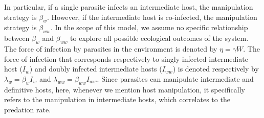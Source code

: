 \documentclass[11pt]{article}
\begin{document}
In particular, if a single parasite infects an intermediate host, the manipulation strategy is $\beta_w$. 
However, if the intermediate host is co-infected, the manipulation strategy is $\beta_{ww}$. 
In the scope of this model, we assume no specific relationship between $\beta_w$ and $\beta_{ww}$ to explore all possible ecological outcomes of the system. 
The force of infection by parasites in the environment is denoted by $\eta = \gamma W$. 
The force of infection that corresponds respectively to singly infected intermediate host ($I_w$) and doubly infected intermediate hosts ($I_{ww}$) is denoted respectively by $\lambda_w = \beta_w I_w$ and $\lambda_{ww} = \beta_{ww} I_{ww}$. 
Since parasites can manipulate intermediate and definitive hosts, here, whenever we mention host manipulation, it specifically refers to the manipulation in intermediate hosts, which correlates to the predation rate.
\end{document}
